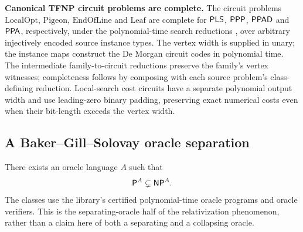 \begin{result}
\textbf{Canonical TFNP circuit problems are complete.}
The circuit problems $\mathrm{LocalOpt}$, $\mathrm{Pigeon}$,
$\mathrm{EndOfLine}$ and $\mathrm{Leaf}$ are complete for $\mathsf{PLS}$,
$\mathsf{PPP}$, $\mathsf{PPAD}$ and $\mathsf{PPA}$, respectively, under the
polynomial-time search reductions , over arbitrary
injectively encoded source instance types. The vertex width is supplied in unary;
the instance maps construct the De Morgan circuit codes in polynomial time.
The intermediate family-to-circuit reductions preserve the family's vertex
witnesses; completeness follows by composing with each source problem's
class-defining reduction. Local-search cost circuits have a separate polynomial
output width and use leading-zero binary padding, preserving exact numerical
costs even when their bit-length exceeds the vertex width.
\citep{JohnsonPapadimitriouYannakakis1988,Papadimitriou1994PPAD,BeameEtAl1998}
\end{result}

\begin{result}
\subsection{A Baker--Gill--Solovay oracle separation}
There exists an oracle language $A$ such that
\[
\mathsf{P}^{A}\subsetneq\mathsf{NP}^{A}.
\]
The classes use the library's certified polynomial-time oracle programs and
oracle verifiers. This is the separating-oracle half of the relativization
phenomenon, rather than a claim here of both a separating and a collapsing
oracle.\citep{BakerGillSolovay1975}
\end{result}

